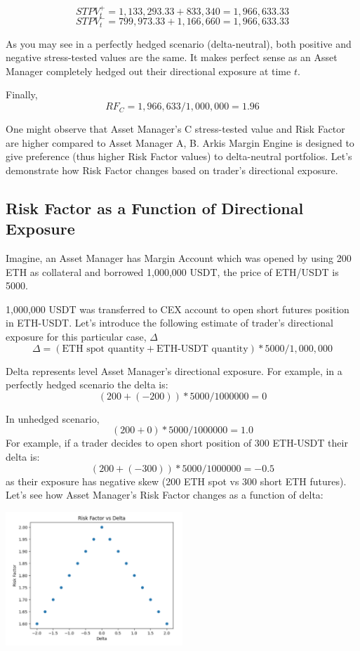 \documentclass[conference]{IEEEtran}
\begin{document}
$$STPV_{t}^{+} = 1,133,293.33+833,340 = 1,966,633.33$$
$$STPV_{t}^{-} = 799,973.33+1,166,660 = 1,966,633.33$$

As you may see in a perfectly hedged scenario (delta-neutral), both positive and negative stress-tested values are the same. It makes perfect sense as an Asset Manager completely hedged out their directional exposure at time $t$.

Finally, $$RF_{C} = 1,966,633 / 1,000,000 = 1.96$$

One might observe that Asset Manager’s C stress-tested value and Risk Factor are higher compared to Asset Manager A, B. Arkis Margin Engine is designed to give preference (thus higher Risk Factor values) to delta-neutral portfolios. Let’s demonstrate how Risk Factor changes based on trader’s directional exposure. 


\subsection{Risk Factor as a Function of Directional Exposure}

Imagine, an Asset Manager has Margin Account which was opened by using 200 ETH as collateral and borrowed 1,000,000 USDT, the price of ETH/USDT is 5000.

1,000,000 USDT was transferred to CEX account to open short futures position in ETH-USDT. Let’s introduce the following estimate of trader's directional exposure for this particular case, $\Delta$ $$\Delta = (\text{ETH spot quantity} + \text{ETH-USDT quantity}) * 5000 / 1,000,000$$

Delta represents level Asset Manager’s directional exposure. For example, in a perfectly hedged scenario the delta is: $$(200 + (-200)) * 5000 / 1 000 000 = 0$$ 

In unhedged scenario, $$(200 + 0) * 5000 / 1 000 000 = 1.0$$ For example, if a trader decides to open short position of 300 ETH-USDT their delta is: $$(200 + (-300))*5000 / 1 000 000 = -0.5$$
as their exposure has negative skew (200 ETH spot vs 300 short ETH futures). 
Let’s see how Asset Manager’s Risk Factor changes as a function of delta:

{
\centering
\includegraphics[width=0.5\textwidth]{images/delta_vs_rf.png}
}
\end{document}
